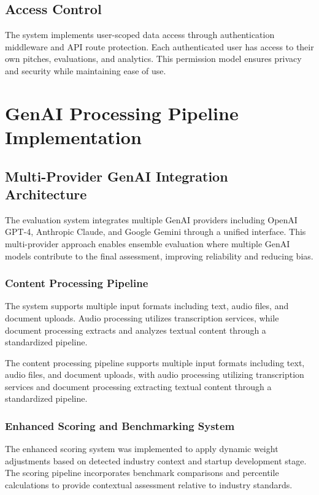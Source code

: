 \subsection{Access Control}
The system implements user-scoped data access through authentication middleware and API route protection. Each authenticated user has access to their own pitches, evaluations, and analytics. This permission model ensures privacy and security while maintaining ease of use.


\section{GenAI Processing Pipeline Implementation}

\subsection{Multi-Provider GenAI Integration Architecture}
The evaluation system integrates multiple GenAI providers including OpenAI GPT-4, Anthropic Claude, and Google Gemini through a unified interface. This multi-provider approach enables ensemble evaluation where multiple GenAI models contribute to the final assessment, improving reliability and reducing bias.

\subsubsection{Content Processing Pipeline}
The system supports multiple input formats including text, audio files, and document uploads. Audio processing utilizes transcription services, while document processing extracts and analyzes textual content through a standardized pipeline.

The content processing pipeline supports multiple input formats including text, audio files, and document uploads, with audio processing utilizing transcription services and document processing extracting textual content through a standardized pipeline.

\subsubsection{Enhanced Scoring and Benchmarking System}
The enhanced scoring system was implemented to apply dynamic weight adjustments based on detected industry context and startup development stage. The scoring pipeline incorporates benchmark comparisons and percentile calculations to provide contextual assessment relative to industry standards.

